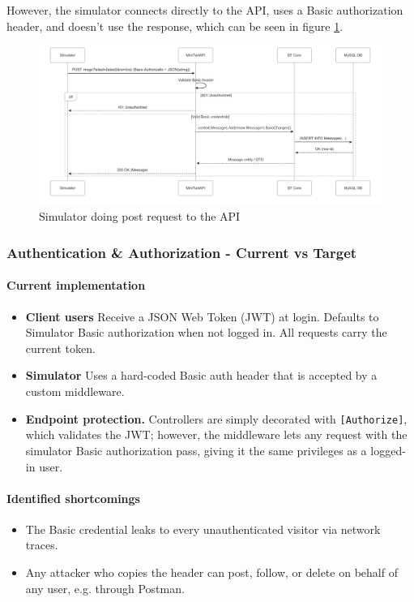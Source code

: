 However, the simulator connects directly to the API, uses a Basic authorization header, and doesn't use the response, which can be seen in figure \ref{fig:SimSeq2}.

\begin{figure}[H]
    \centering
    \includegraphics[width=1\linewidth]{images/SimSeq2.png}
    \caption{Simulator doing post request to the API}
    \label{fig:SimSeq2}
\end{figure}

\subsubsection{Authentication \& Authorization - Current vs Target}
\label{sec:auth-current-target}

\paragraph{Current implementation}
\begin{itemize}
  \item \textbf{Client users}  
        Receive a JSON Web Token (JWT) at login. Defaults to Simulator Basic authorization when not logged in. All requests
        carry the current token.
  \item \textbf{Simulator}  
        Uses a hard-coded Basic auth header that is accepted by a custom middleware.
  \item \textbf{Endpoint protection.}  
        Controllers are simply decorated with \verb|[Authorize]|, which
        validates the JWT; however, the middleware lets any request with
        the simulator Basic authorization pass, giving it the same privileges as a logged-in user.
\end{itemize}

\paragraph{Identified shortcomings}
\begin{itemize}
  \item The Basic credential leaks to every unauthenticated visitor via
        network traces.
  \item Any attacker who copies the header can post, follow, or delete
        on behalf of any user, e.g. through Postman.
\end{itemize}

